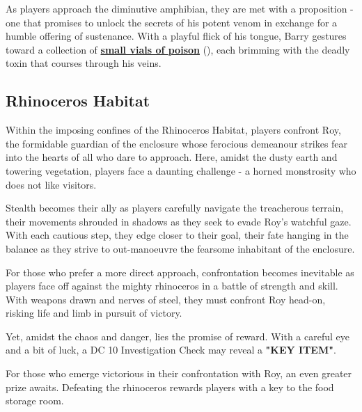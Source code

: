 As players approach the diminutive amphibian, they are met with a proposition - one that promises to unlock the secrets of his potent venom in exchange for a humble offering of sustenance. With a playful flick of his tongue, Barry gestures toward a collection of \hyperref[sec:VialOfPoison-DartFrogPoison]{\textbf{small vials of poison}} (), each brimming with the deadly toxin that courses through his veins.
\subsection*{ Rhinoceros Habitat}
Within the imposing confines of the Rhinoceros Habitat, players confront Roy, the formidable guardian of the enclosure whose ferocious demeanour strikes fear into the hearts of all who dare to approach. Here, amidst the dusty earth and towering vegetation, players face a daunting challenge - a horned monstrosity who does not like visitors.

Stealth becomes their ally as players carefully navigate the treacherous terrain, their movements shrouded in shadows as they seek to evade Roy's watchful gaze. With each cautious step, they edge closer to their goal, their fate hanging in the balance as they strive to out-manoeuvre the fearsome inhabitant of the enclosure.

For those who prefer a more direct approach, confrontation becomes inevitable as players face off against the mighty rhinoceros in a battle of strength and skill. With weapons drawn and nerves of steel, they must confront Roy head-on, risking life and limb in pursuit of victory.

Yet, amidst the chaos and danger, lies the promise of reward. With a careful eye and a bit of luck, a DC 10 Investigation Check may reveal a \textbf{"KEY ITEM"}.

For those who emerge victorious in their confrontation with Roy, an even greater prize awaits. Defeating the rhinoceros rewards players with a key to the food storage room.

